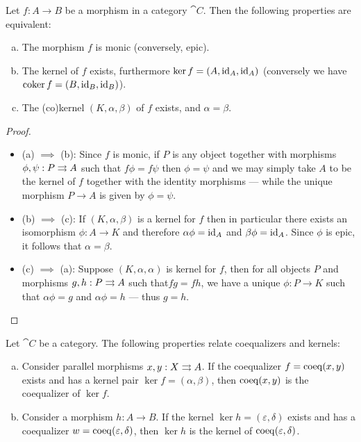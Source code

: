 \begin{proposition}
\label{prop:}
Let \(f: A \to B\) be a morphism in a category \(\cat C\). Then the following
properties are equivalent:
\begin{enumerate}[(a)]\setlength\itemsep{0em}
\item The morphism \(f\) is monic (conversely, epic).
\item The kernel of \(f\) exists, furthermore \(\ker f = (A, \operatorname{id}_A, \operatorname{id}_A)\)
  (conversely we have \(\operatorname{coker} f = (B, \operatorname{id}_B, \operatorname{id}_B)\)).
\item The (co)kernel \((K, \alpha, \beta)\) of \(f\) exists, and
  \(\alpha = \beta\).
\end{enumerate}
\end{proposition}

\begin{proof}
\begin{itemize}\setlength\itemsep{0em}
\item (a) \(\implies\) (b): Since \(f\) is monic, if \(P\) is any object
  together with morphisms \(\phi, \psi: P \rightrightarrows A\) such that
  \(f \phi = f \psi\) then \(\phi = \psi\) and we may simply take \(A\) to be
  the kernel of \(f\) together with the identity morphisms --- while the unique
  morphism \(P \to A\) is given by \(\phi = \psi\).

\item (b) \(\implies\) (c): If \((K, \alpha, \beta)\) is a kernel for \(f\) then
  in particular there exists an isomorphism \(\phi: A \to K\) and therefore
  \(\alpha \phi = \operatorname{id}_A\) and \(\beta \phi = \operatorname{id}_A\). Since \(\phi\) is
  epic, it follows that \(\alpha = \beta\).

\item (c) \(\implies\) (a): Suppose \((K, \alpha, \alpha)\) is kernel for \(f\),
  then for all objects \(P\) and morphisms \(g, h: P \rightrightarrows A\) such that\(f g =
  f h\), we have a unique \(\phi: P \to K\) such that \(\alpha \phi = g\) and
  \(\alpha \phi = h\) --- thus \(g = h\).
\end{itemize}
\end{proof}

\begin{proposition}
\label{prop:coeq-and-ker}
Let \(\cat C\) be a category. The
following properties relate coequalizers and kernels:
\begin{enumerate}[(a)]\setlength\itemsep{0em}
\item Consider parallel morphisms \(x, y: X \rightrightarrows A\). If the coequalizer
  \(f = \operatorname{coeq}(x, y)\) exists and has a kernel pair \(\ker f = (\alpha, \beta)\),
  then \(\operatorname{coeq}(x, y)\) is the coequalizer of \(\ker f\).

\item Consider a morphism \(h: A \to B\). If the kernel
  \(\ker h = (\varepsilon, \delta)\) exists and has a coequalizer
  \(w = \operatorname{coeq}(\varepsilon, \delta)\), then \(\ker h\) is the kernel of
  \(\operatorname{coeq}(\varepsilon, \delta)\).
\end{enumerate}
\end{proposition}

